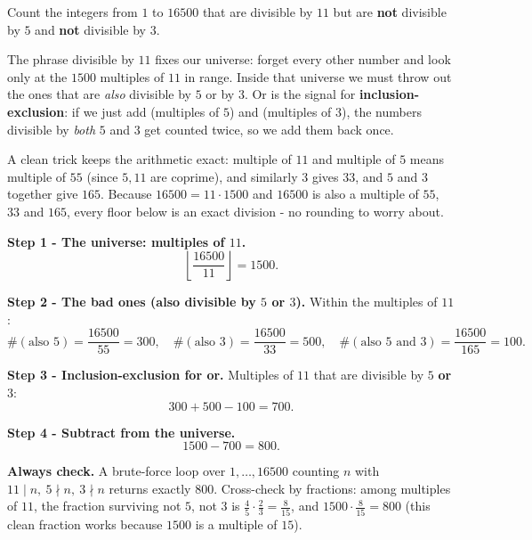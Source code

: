 \documentclass[11pt,a4paper]{article}
\begin{document}
\begin{problembox}[7]
Count the integers from $1$ to $16500$ that are divisible by $11$ but are \textbf{not} divisible by
$5$ and \textbf{not} divisible by $3$.
\end{problembox}

\begin{ideabox}
The phrase \textquotedbl{}divisible by $11$\textquotedbl{} fixes our universe: forget every other
number and look only at the $1500$ multiples of $11$ in range. Inside that universe we must throw
out the ones that are \emph{also} divisible by $5$ or by $3$. \textquotedbl{}Or\textquotedbl{} is the
signal for \textbf{inclusion-exclusion}: if we just add (multiples of $5$) and (multiples of $3$),
the numbers divisible by \emph{both} $5$ and $3$ get counted twice, so we add them back once.

A clean trick keeps the arithmetic exact: \textquotedbl{}multiple of $11$ and multiple of
$5$\textquotedbl{} means \textquotedbl{}multiple of $55$\textquotedbl{} (since $5,11$ are coprime),
and similarly $3$ gives $33$, and $5$ and $3$ together give $165$. Because $16500=11\cdot1500$ and
$16500$ is also a multiple of $55$, $33$ and $165$, every floor below is an exact division - no
rounding to worry about.
\end{ideabox}

\textbf{Step 1 - The universe: multiples of $11$.}
$$\left\lfloor\frac{16500}{11}\right\rfloor=1500.$$

\textbf{Step 2 - The \textquotedbl{}bad\textquotedbl{} ones (also divisible by $5$ or $3$).}
Within the multiples of $11$:
$$\#(\text{also }5)=\frac{16500}{55}=300,\quad
  \#(\text{also }3)=\frac{16500}{33}=500,\quad
  \#(\text{also }5\text{ and }3)=\frac{16500}{165}=100.$$

\textbf{Step 3 - Inclusion-exclusion for \textquotedbl{}or\textquotedbl{}.}
Multiples of $11$ that are divisible by $5$ \textbf{or} $3$:
$$300+500-100=700.$$

\textbf{Step 4 - Subtract from the universe.}
$$1500-700=800.$$

\textbf{Always check.} A brute-force loop over $1,\dots,16500$ counting $n$ with
$11\mid n,\ 5\nmid n,\ 3\nmid n$ returns exactly $800$. Cross-check by fractions: among multiples of
$11$, the fraction surviving \textquotedbl{}not $5$, not $3$\textquotedbl{} is
$\frac{4}{5}\cdot\frac{2}{3}=\frac{8}{15}$, and $1500\cdot\frac{8}{15}=800$ (this clean fraction
works because $1500$ is a multiple of $15$). \checkmark
\end{document}

